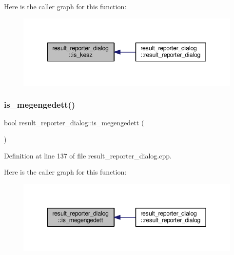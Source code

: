 Here is the caller graph for this function\+:\nopagebreak
\begin{figure}[H]
\begin{center}
\leavevmode
\includegraphics[width=342pt]{classresult__reporter__dialog_aa01c9e3700c0ad800faaa1e1e7e27cda_icgraph}
\end{center}
\end{figure}
\mbox{\label{classresult__reporter__dialog_ae2edb766d3140ac31714c6bca7522177}} 
\subsubsection{\texorpdfstring{is\+\_\+megengedett()}{is\_megengedett()}}
{\footnotesize\ttfamily bool result\+\_\+reporter\+\_\+dialog\+::is\+\_\+megengedett (\begin{DoxyParamCaption}{ }\end{DoxyParamCaption})\hspace{0.3cm}{\ttfamily [private]}}



Definition at line 137 of file result\+\_\+reporter\+\_\+dialog.\+cpp.

Here is the caller graph for this function\+:\nopagebreak
\begin{figure}[H]
\begin{center}
\leavevmode
\includegraphics[width=342pt]{classresult__reporter__dialog_ae2edb766d3140ac31714c6bca7522177_icgraph}
\end{center}
\end{figure}
\mbox{\label{classresult__reporter__dialog_a8a8acd3370d0fb4a8a3233f90988edd2}} 
